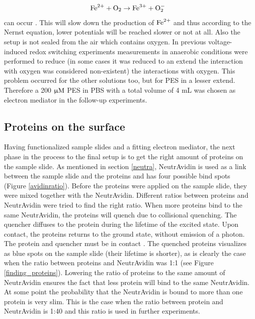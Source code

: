 \documentclass[twoside,single]{lion-msc}
\begin{document}
$$\textup{Fe}^{2+}+\textup{O}_{2}\rightarrow\textup{Fe}^{3+}+\textup{O}_{2}^{-} $$
can occur \cite{Grady1991}. This will slow down the production of $\textup{Fe}^{2+}$ and thus according to the Nernst equation, lower potentials will be reached slower or not at all. Also the setup is not sealed from the air which contains oxygen. In previous voltage-induced redox switching experiments\cite{Akkilic2015} measurements in anaerobic conditions were performed to reduce (in some cases it was reduced to an extend the interaction with oxygen was considered non-existent) the interactions with oxygen. This problem occurred for the other solutions too, but for PES in a lesser extend. Therefore a 200 $\upmu \textup{M}$ PES in PBS with a total volume of 4 mL was chosen as electron mediator in the follow-up experiments.
 

\subsection{Proteins on the surface}
Having functionalized sample slides and a fitting electron mediator, the next phase in the process to the final setup is to get the right amount of proteins on the sample slide. As mentioned in section \ref{neutra},  NeutrAvidin is used as a link between the sample slide and the proteins and has four possible bind spots  (Figure \ref{avidinratio}). Before the proteins were applied on the sample slide, they were mixed together with the NeutrAvidin. Different ratios between proteins and NeutrAvidin were tried to find the right ratio. When more proteins bind to the same NeutrAvidin, the proteins will quench due to collisional quenching. The quencher diffuses to the protein during the lifetime of the excited state. Upon contact, the proteins returns to the ground state, without emission of a photon. The protein and quencher must be in contact \cite{Lakowicz2006}. The quenched proteins visualizes as blue spots on the sample slide (their lifetime is shorter), as is clearly the case when the ratio between proteins and NeutrAvidin was 1:1 (see Figure \ref{finding_proteins}). Lowering the ratio of proteins to the same amount of NeutrAvidin ensures the fact that less protein will bind to the same NeutrAvidin. At some point the probability that the NeutrAvidin is bound to more than one protein is very slim. This is the case when the ratio between protein and NeutrAvidin is 1:40 and this ratio is used in further experiments.
\end{document}
